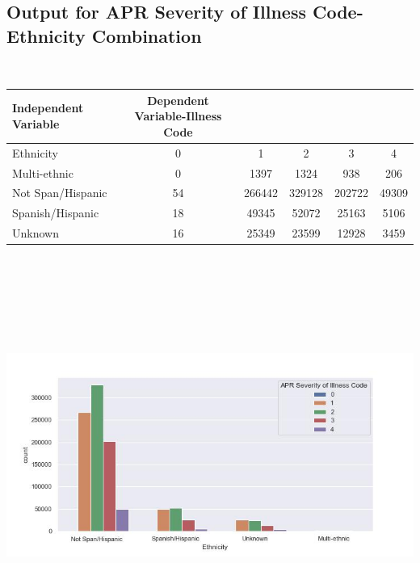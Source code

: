 \documentclass[
	letterpaper, %
]{jdf}
\begin{document}
\subsection{Output for APR Severity of Illness Code-Ethnicity Combination}
\ 
\begin{jdftable}
\label{table:Example}
\small %
\begin{tabular}{@{} l c c c c c}
\textbf{Independent Variable} & \textbf{Dependent Variable-Illness Code} & & & & \\
	\toprule[0.5pt]
Ethnicity & 0 & 1 & 2 & 3 & 4 \\
\midrule
Multi-ethnic & 0 & 1397 & 1324 & 938 & 206 \\
\midrule
Not Span/Hispanic & 54 & 266442 & 329128 & 202722 & 49309 \\
\midrule
Spanish/Hispanic & 18 & 49345 & 52072 & 25163 & 5106 \\
\midrule
Unknown & 16 & 25349 & 23599 & 12928 & 3459 \\
\end{tabular}
\end{jdftable}

\begin{jdffigure}
\includegraphics[height=13cm]{Figures/code-Ethnicity.jpg} \\
\label{fig:code-Ethnicity}%
\end{jdffigure}
\end{document}
